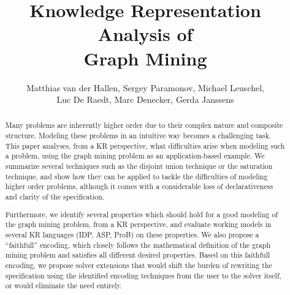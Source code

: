 \documentclass{new_tlp}
\author[]{Matthias van der Hallen, Sergey Paramonov, Michael Leuschel,\\ Luc De Raedt, Marc Denecker, Gerda Janssens}
\title{Knowledge Representation Analysis of\\ Graph Mining}
\begin{document}
\maketitle
\begin{abstract}
Many problems are inherently higher order due to their complex nature and composite structure.
Modeling these problems in an intu\"itive way becomes a challenging task.
This paper analyses, from a KR perspective, what difficulties arise when modeling such a problem, using the graph mining problem as an application-based example.
We summarize several techniques such as the disjoint union technique or the saturation technique, and show how they can be applied to tackle the difficulties of modeling higher order problems, although it comes with a considerable loss of declarativeness and clarity of the specification.

Furthermore, we identify several properties which should hold for a good modeling of the graph mining problem, from a KR perspective, and evaluate working models in several KR languages (IDP, ASP, ProB) on these properties.
We also propose a ``faithfull'' encoding, which closely follows the mathematical definition of the graph mining problem and satisfies all different desired properties.
Based on this faithfull encoding, we propose solver extensions that would shift the burden of rewriting the specification using the identified encoding techniques from the user to the solver itself, or would eliminate the need entirely.

\end{abstract}


%









\end{document}
